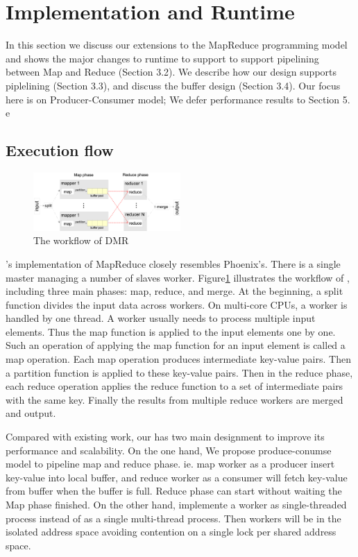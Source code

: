 \section{Implementation and Runtime}
In this section we discuss our extensions to 
the MapReduce programming model and shows the major changes to runtime to 
support \myds
to support pipelining between Map and Reduce (Section 3.2). 
We describe how our design supports
piplelining (Section 3.3), and discuss the buffer design (Section 3.4). 
Our focus here is on Producer-Consumer model; 
We defer performance results to Section 5.
e


\subsection{Execution flow}
\begin{figure}[!h!t]  
    \centering
    \includegraphics[width=0.5\textwidth]{eps/dmr_workflow.eps}
    \caption{The workflow of DMR}
    \label{fig:dmr:workflow}
\end{figure}

\myds's implementation of MapReduce closely resembles Phoenix’s. 
There is a single master managing a number of slaves worker. 
Figure\ref{fig:dmr:workflow} illustrates the workflow of \myds,
including three main phases: map, reduce, and merge. 
At the beginning, a split function divides the input
data across workers. 
On multi-core CPUs, a worker is handled by one thread. 
A worker usually needs to process multiple input elements. 
Thus the map function is applied to the input elements one by one. 
Such an operation of applying the map function for an input element is 
called a map operation. 
Each map operation produces intermediate key-value pairs. 
Then a partition function is applied to these key-value pairs. 
Then in the reduce phase, each reduce operation
applies the reduce function to a set of intermediate pairs
with the same key. 
Finally the results from multiple reduce workers are merged and output.

Compared with existing work, 
our \myds has two main designment to improve its performance and scalability.
On the one hand, We propose produce-conumse model to 
pipeline map and reduce phase. 
ie. map worker as a producer insert key-value into local buffer,
and reduce worker as a consumer will fetch key-value from buffer
when the buffer is full. 
Reduce phase can start without waiting the Map phase finished.
On the other hand, \myds implemente a worker as single-threaded process 
instead of as a single multi-thread process.
Then workers will be in the isolated address space 
avoiding contention on a single lock per shared address space.

